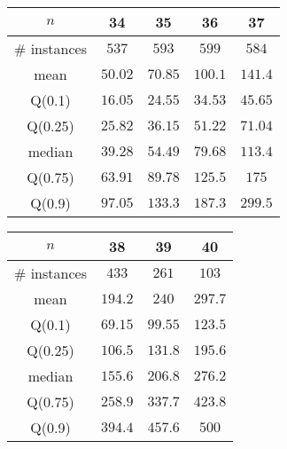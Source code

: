 \begin{tabular}{c|cccc} 
\hline 
$n$ & 34 & 35 & 36 & 37 \tabularnewline 
\hline 
\hline 
\# instances & $537$ & $593$ & $599$ & $584$ \tabularnewline 
mean & $50.02$ & $70.85$ & $100.1$ & $141.4$ \tabularnewline 
Q(0.1) & $16.05$ & $24.55$ & $34.53$ & $45.65$ \tabularnewline 
Q(0.25) & $25.82$ & $36.15$ & $51.22$ & $71.04$ \tabularnewline 
median & $39.28$ & $54.49$ & $79.68$ & $113.4$ \tabularnewline 
Q(0.75) & $63.91$ & $89.78$ & $125.5$ & $175$ \tabularnewline 
Q(0.9) & $97.05$ & $133.3$ & $187.3$ & $299.5$ \tabularnewline 
\hline 
\end{tabular} 
\medskip{} 

\begin{tabular}{c|ccc} 
\hline 
$n$ & 38 & 39 & 40 \tabularnewline 
\hline 
\hline 
\# instances & $433$ & $261$ & $103$ \tabularnewline 
mean & $194.2$ & $240$ & $297.7$ \tabularnewline 
Q(0.1) & $69.15$ & $99.55$ & $123.5$ \tabularnewline 
Q(0.25) & $106.5$ & $131.8$ & $195.6$ \tabularnewline 
median & $155.6$ & $206.8$ & $276.2$ \tabularnewline 
Q(0.75) & $258.9$ & $337.7$ & $423.8$ \tabularnewline 
Q(0.9) & $394.4$ & $457.6$ & $500$ \tabularnewline 
\hline 
\end{tabular} 
\medskip{} 

